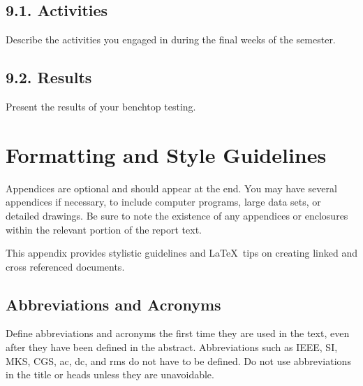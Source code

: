 \documentclass[10pt]{article}
\begin{document}
\subsection{9.1. Activities}
Describe the activities you engaged in during the final weeks of the semester.

\subsection{9.2. Results}
Present the results of your benchtop testing. 





\clearpage
\appendix
\section{Formatting and Style Guidelines}\label{app-style}
Appendices are optional and should appear at the end. You may have several appendices if necessary, to include computer programs, large data sets, or detailed drawings. Be sure to note the existence of any appendices or enclosures within the relevant portion of the report text.  

This appendix provides stylistic guidelines and \LaTeX\ tips on creating linked and cross referenced documents.  

\subsection{Abbreviations and Acronyms}
Define abbreviations and acronyms the first time they are used in the text, even after they have been defined in the abstract. Abbreviations such as IEEE, SI, MKS, CGS, ac, dc, and rms do not have to be defined. Do not use abbreviations in the title or heads unless they are unavoidable.
\end{document}
